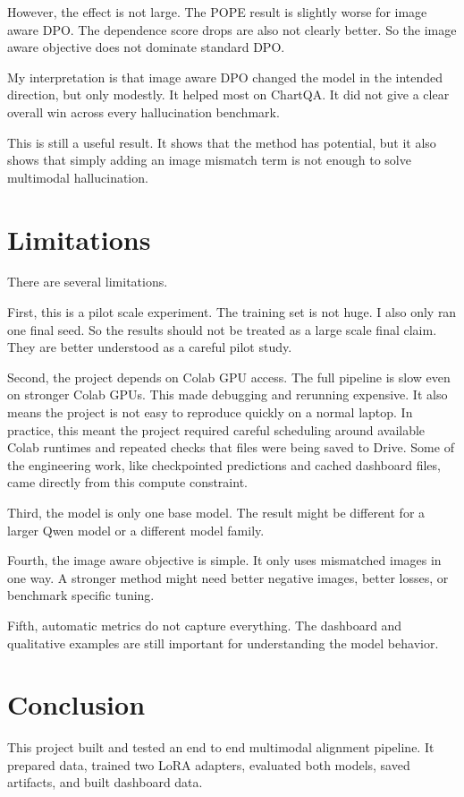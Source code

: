 \documentclass{article}
\begin{document}
However, the effect is not large.
The POPE result is slightly worse for image aware DPO.
The dependence score drops are also not clearly better.
So the image aware objective does not dominate standard DPO.

My interpretation is that image aware DPO changed the model in the intended direction, but only modestly.
It helped most on ChartQA.
It did not give a clear overall win across every hallucination benchmark.

This is still a useful result.
It shows that the method has potential, but it also shows that simply adding an image mismatch term is not enough to solve multimodal hallucination.

\section{Limitations}
There are several limitations.

First, this is a pilot scale experiment.
The training set is not huge.
I also only ran one final seed.
So the results should not be treated as a large scale final claim.
They are better understood as a careful pilot study.

Second, the project depends on Colab GPU access.
The full pipeline is slow even on stronger Colab GPUs.
This made debugging and rerunning expensive.
It also means the project is not easy to reproduce quickly on a normal laptop.
In practice, this meant the project required careful scheduling around available Colab runtimes and repeated checks that files were being saved to Drive.
Some of the engineering work, like checkpointed predictions and cached dashboard files, came directly from this compute constraint.

Third, the model is only one base model.
The result might be different for a larger Qwen model or a different model family.

Fourth, the image aware objective is simple.
It only uses mismatched images in one way.
A stronger method might need better negative images, better losses, or benchmark specific tuning.

Fifth, automatic metrics do not capture everything.
The dashboard and qualitative examples are still important for understanding the model behavior.

\section{Conclusion}
This project built and tested an end to end multimodal alignment pipeline.
It prepared data, trained two LoRA adapters, evaluated both models, saved artifacts, and built dashboard data.
\end{document}
